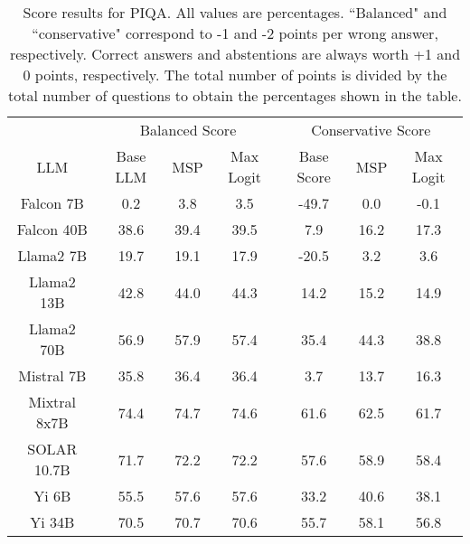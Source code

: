 \renewcommand\arraystretch{1.2}
\begin{table*}
\centering
\begin{tabular}{c|c|c|c|c|c|c}
& \multicolumn{3}{c|}{Balanced Score} & \multicolumn{3}{c}{Conservative Score} \\ 
LLM & Base LLM & MSP & Max Logit & Base Score & MSP & Max Logit\\ \hline
Falcon 7B & 0.2 & 3.8 & 3.5 & -49.7 & 0.0 & -0.1\\
Falcon 40B & 38.6 & 39.4 & 39.5 & 7.9 & 16.2 & 17.3\\
Llama2 7B & 19.7 & 19.1 & 17.9 & -20.5 & 3.2 & 3.6\\
Llama2 13B & 42.8 & 44.0 & 44.3 & 14.2 & 15.2 & 14.9\\
Llama2 70B & 56.9 & 57.9 & 57.4 & 35.4 & 44.3 & 38.8\\
Mistral 7B & 35.8 & 36.4 & 36.4 & 3.7 & 13.7 & 16.3\\
Mixtral 8x7B & 74.4 & 74.7 & 74.6 & 61.6 & 62.5 & 61.7\\
SOLAR 10.7B & 71.7 & 72.2 & 72.2 & 57.6 & 58.9 & 58.4\\
Yi 6B & 55.5 & 57.6 & 57.6 & 33.2 & 40.6 & 38.1\\
Yi 34B & 70.5 & 70.7 & 70.6 & 55.7 & 58.1 & 56.8\\
\hline
\end{tabular}
\caption{Score results for PIQA. All values are percentages. ``Balanced" and ``conservative" correspond to -1 and -2 points per wrong answer, respectively. Correct answers and abstentions are always worth +1 and 0 points, respectively. The total number of points is divided by the total number of questions to obtain the percentages shown in the table.}
\label{tab:piqa_score}
\end{table*}
